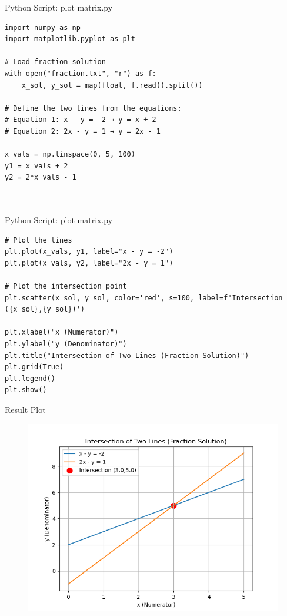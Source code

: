 \documentclass{beamer}
\numberwithin{equation}{section}
\theoremstyle{remark}
\begin{document}
\begin{frame}[fragile]{Python Script: plot matrix.py}
\begin{verbatim}
import numpy as np
import matplotlib.pyplot as plt

# Load fraction solution
with open("fraction.txt", "r") as f:
    x_sol, y_sol = map(float, f.read().split())

# Define the two lines from the equations:
# Equation 1: x - y = -2 → y = x + 2
# Equation 2: 2x - y = 1 → y = 2x - 1

x_vals = np.linspace(0, 5, 100)
y1 = x_vals + 2
y2 = 2*x_vals - 1



\end{verbatim}
\end{frame}
\begin{frame}[fragile]{Python Script: plot matrix.py}
\begin{verbatim}
# Plot the lines
plt.plot(x_vals, y1, label="x - y = -2")
plt.plot(x_vals, y2, label="2x - y = 1")

# Plot the intersection point
plt.scatter(x_sol, y_sol, color='red', s=100, label=f'Intersection ({x_sol},{y_sol})')

plt.xlabel("x (Numerator)")
plt.ylabel("y (Denominator)")
plt.title("Intersection of Two Lines (Fraction Solution)")
plt.grid(True)
plt.legend()
plt.show()
\end{verbatim}
\end{frame}

\begin{frame}{Result Plot}
 \begin{figure}[H]
     \centering
     \includegraphics[width=0.7\columnwidth]{figs/fig1.png}
     \caption*{}
     \label{fig:fig1}
 \end{figure}
 
\end{frame}
\end{document}
